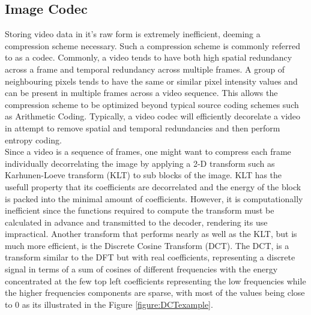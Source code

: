 \documentclass[a4paper,11pt,oneside]{article}
\begin{document}
\subsection{Image Codec}
\indent Storing video data in it's raw form is extremely inefficient, deeming a compression scheme necessary. Such a compression scheme is commonly referred to as a codec. 
Commonly, a video tends to have both high spatial redundancy across a frame and temporal redundancy across multiple frames. A group of neighbouring pixels tends to have the same or similar pixel intensity values and can be present in multiple frames across a video sequence. This allows the compression scheme to be optimized beyond typical source coding schemes such as Arithmetic Coding. Typically, a video codec will efficiently decorelate a video in attempt to remove spatial and temporal redundancies and then perform entropy coding.\\
\indent %
Since a video is a sequence of frames, one might want to compress each frame individually decorrelating the image by applying a 2-D transform such as Karhunen-Loeve transform (KLT) to sub blocks of the image. KLT has the usefull property that its coefficients are decorrelated and the energy of the block is packed into the minimal amount of coefficients. However, it is computationally inefficient since the functions required to compute the transform must be calculated in advance and transmitted to the decoder, rendering its use impractical. Another transform that performs nearly as well as the KLT, but is much more efficient, is the Discrete Cosine Transform (DCT). The DCT, is a transform similar to the DFT but with real
coefficients, representing a discrete signal in terms of a sum of cosines of different frequencies with the energy concentrated at the few top left coefficients representing the low frequencies while the higher frequencies components are sparse, with most of the values being close to $0$ as its illustrated in the Figure \ref{figure:DCTexample}.
\end{document}
